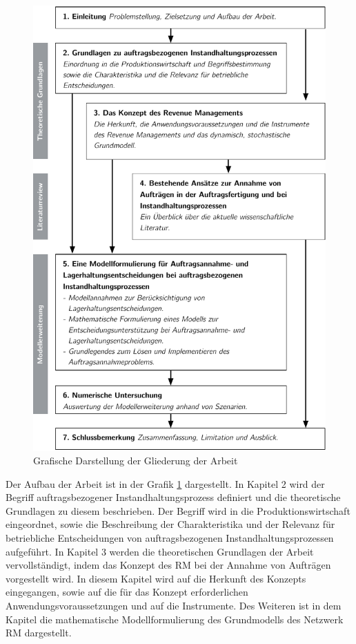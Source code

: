 \begin{figure}[h!]
  \begin{center}
    \includegraphics[width=140mm]{Bilder/Gliederung.pdf}
    \caption{Grafische Darstellung der Gliederung der Arbeit}  \label{Gliederung}
  \end{center}
\end{figure}


Der Aufbau der Arbeit ist in der Grafik \ref{Gliederung} dargestellt. In Kapitel 2 wird der Begriff \glqq auftragsbezogener Instandhaltungsprozess{\glqq} definiert und die theoretische Grundlagen zu diesem beschrieben. Der Begriff wird in die Produktionswirtschaft eingeordnet, sowie die Beschreibung der Charakteristika und der Relevanz für betriebliche Entscheidungen von auftragsbezogenen Instandhaltungsprozessen aufgeführt. In Kapitel 3 werden die theoretischen Grundlagen der Arbeit vervollständigt, indem das Konzept des RM bei der Annahme von Aufträgen vorgestellt wird. In diesem Kapitel wird auf die Herkunft des Konzepts eingegangen, sowie auf die für das Konzept erforderlichen Anwendungsvoraussetzungen und auf die Instrumente. Des Weiteren ist in dem Kapitel die mathematische Modellformulierung des Grundmodells des Netzwerk RM dargestellt.

